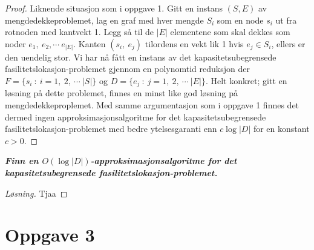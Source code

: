 \documentclass[12pt]{article}
\newenvironment{solution}{\begin{proof}[Løsning]}{\end{proof}}
\begin{document}
\begin{proof}
Liknende situasjon som i oppgave 1. Gitt en instans $(S, E)$ av mengdedekkeproblemet, lag en graf med hver mengde $S_i$ som en node $s_i$ ut fra rotnoden med kantvekt 1. Legg så til de $|E|$ elementene som skal dekkes som noder $e_1, ~e_2, \cdots ~e_{|E|}$. Kanten $(s_i, ~e_j)$ tilordens en vekt lik 1 hvis $e_j \in S_i$, ellers er den uendelig stor. Vi har nå fått en instans av det kapasitetsubegrensede fasilitetslokasjon-problemet gjennom en polynomtid reduksjon der $F = \{s_i ~: ~i = 1, ~2, ~\cdots ~|S|\}$ og $D = \{e_j ~: ~j = 1, ~2, ~\cdots ~|E|\}$. Helt konkret; gitt en løsning på dette problemet, finnes en minst like god løsning på mengdedekkeproplemet. Med samme argumentasjon som i oppgave 1 finnes det dermed ingen approksimasjonsalgoritme for det kapasitetsubegrensede fasilitetslokasjon-problemet med bedre ytelsesgaranti enn $c \log |D|$ for en konstant $c>0$.
\end{proof}

\it{\textbf{Finn en $O(\log |D|)$-approksimasjonsalgoritme for det kapasitetsubegrensede fasilitetslokasjon-problemet.}}

\begin{solution}
Tjaa
\end{solution}

\section{Oppgave 3}
\end{document}
